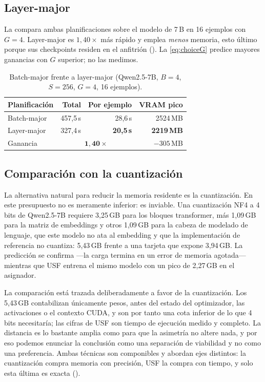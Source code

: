 \documentclass[journal]{IEEEtran}
\newcommand{\usf}{USF}
\begin{document}
\subsection{Layer-major}

La  compara ambas planificaciones sobre el modelo de 7\,B en 16 ejemplos con $G=4$.
Layer-major es $1{,}40\times$ más rápido y emplea \emph{menos} memoria, esto último porque sus
checkpoints residen en el anfitrión (). La \eqref{eq:choiceG} predice mayores
ganancias con $G$ superior; no las medimos.

\begin{table}[t]
\centering
\caption{Batch-major frente a layer-major (Qwen2.5-7B, $B{=}4$, $S{=}256$, $G{=}4$, 16 ejemplos).}
\label{tab:lm}
\footnotesize
\begin{tabular}{@{}lrrr@{}}
\toprule
\textbf{Planificación} & \textbf{Total} & \textbf{Por ejemplo} & \textbf{VRAM pico} \\
\midrule
Batch-major & 457,5\,s & 28,6\,s & 2524\,MB \\
Layer-major & 327,4\,s & \textbf{20,5\,s} & \textbf{2219\,MB} \\
\midrule
Ganancia & \multicolumn{2}{c}{$\mathbf{1{,}40\times}$} & $-305$\,MB \\
\bottomrule
\end{tabular}
\end{table}

\subsection{Comparación con la cuantización}
\label{sec:quant}

La alternativa natural para reducir la memoria residente es la cuantización. En este presupuesto no
es meramente inferior: es inviable. Una cuantización NF4 a 4 bits de Qwen2.5-7B requiere 3,25\,GB
para los bloques transformer, más 1,09\,GB para la matriz de embeddings y otros 1,09\,GB para la
cabeza de modelado de lenguaje, que este modelo no ata al embedding y que la implementación de
referencia no cuantiza: 5,43\,GB frente a una tarjeta que expone 3,94\,GB. La predicción se
confirma ---la carga termina en un error de memoria agotada--- mientras que \usf{} entrena el mismo
modelo con un pico de 2,27\,GB en el asignador.

La comparación está trazada deliberadamente a favor de la cuantización. Los 5,43\,GB contabilizan
únicamente pesos, antes del estado del optimizador, las activaciones o el contexto CUDA, y son por
tanto una cota inferior de lo que 4 bits necesitaría; las cifras de \usf{} son tiempo de ejecución
medido y completo. La distancia es lo bastante amplia como para que la asimetría no altere nada, y
por eso podemos enunciar la conclusión como una separación de viabilidad y no como una
preferencia. Ambas técnicas son componibles y abordan ejes distintos: la cuantización compra
memoria con precisión, \usf{} la compra con tiempo, y solo esta última es exacta
().
\end{document}
